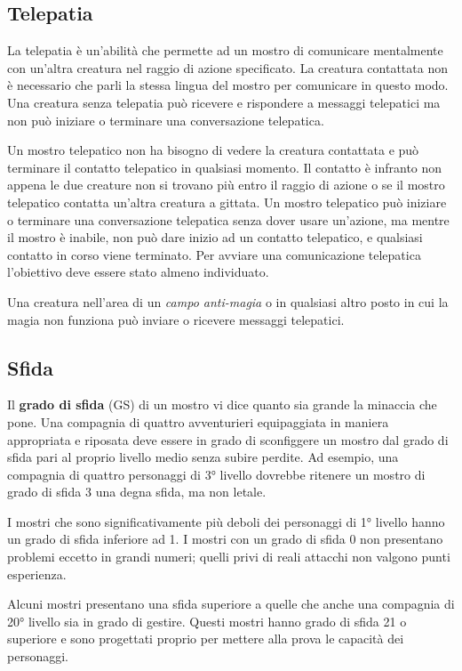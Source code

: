 \begin{multicols}{2}
\subsection{Telepatia}

La telepatia è un'abilità che permette ad un mostro di comunicare mentalmente con un'altra creatura nel raggio di azione specificato. La creatura contattata non è necessario che parli la stessa lingua del mostro per comunicare in questo modo. Una creatura senza telepatia può ricevere e rispondere a messaggi telepatici ma non può iniziare o terminare una conversazione telepatica.

Un mostro telepatico non ha bisogno di vedere la creatura contattata e può terminare il contatto telepatico in qualsiasi momento. Il contatto è infranto non appena le due creature non si trovano più entro il raggio di azione o se il mostro telepatico contatta un'altra creatura a gittata. Un mostro telepatico può iniziare o terminare una conversazione telepatica senza dover usare un'azione, ma mentre il mostro è inabile, non può dare inizio ad un contatto telepatico, e qualsiasi contatto in corso viene terminato. Per avviare una comunicazione telepatica l'obiettivo deve essere stato almeno individuato.

Una creatura nell'area di un \textit{campo anti-magia} o in qualsiasi altro posto in cui la magia non funziona può inviare o ricevere messaggi telepatici.

\subsection{Sfida}

Il \textbf{grado di sfida} (GS) di un mostro vi dice quanto sia grande la minaccia che pone. Una compagnia di quattro avventurieri equipaggiata in maniera appropriata e riposata deve essere in grado di sconfiggere un mostro dal grado di sfida pari al proprio livello medio senza subire perdite. Ad esempio, una compagnia di quattro personaggi di 3° livello dovrebbe ritenere un mostro di grado di sfida 3 una degna sfida, ma non letale.

I mostri che sono significativamente più deboli dei personaggi di 1° livello hanno un grado di sfida inferiore ad 1. I mostri con un grado di sfida 0 non presentano problemi eccetto in grandi numeri; quelli privi di reali attacchi non valgono punti esperienza.

Alcuni mostri presentano una sfida superiore a quelle che anche una compagnia di 20° livello sia in grado di gestire. Questi mostri hanno grado di sfida 21 o superiore e sono progettati proprio per mettere alla prova le capacità dei personaggi.


\end{multicols}

